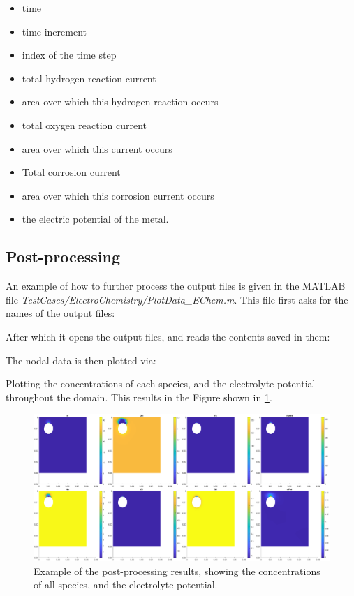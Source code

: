 \documentclass[3p]{elsarticle} %
\newcommand{\CodeSnipU}[4]{}
\begin{document}
\begin{itemize}
	\item time
	\item time increment
	\item index of the time step
	\item total hydrogen reaction current
	\item area over which this hydrogen reaction occurs
	\item total oxygen reaction current
	\item area over which this current occurs
	\item Total corrosion current
	\item area over which this corrosion current occurs
	\item the electric potential of the metal. 
\end{itemize}

\subsection{Post-processing}
An example of how to further process the output files is given in the MATLAB file \textit{TestCases/ElectroChemistry/PlotData\_EChem.m}. This file first asks for the names of the output files:
\CodeSnipU{TestCases/ElectroChemistry/PlotData_EChem.m}{7}{9}{TestCases/ElectroChemistry/PlotData\_EChem.m}
After which it opens the output files, and reads the contents saved in them:
\CodeSnipU{TestCases/ElectroChemistry/PlotData_EChem.m}{45}{61}{TestCases/ElectroChemistry/PlotData\_EChem.m}

The nodal data is then plotted via:
\CodeSnipU{TestCases/ElectroChemistry/PlotData_EChem.m}{78}{87}{TestCases/ElectroChemistry/PlotData\_EChem.m}
Plotting the concentrations of each species, and the electrolyte potential throughout the domain. This results in the Figure shown in \cref{fig:PostProcessingA}.

\begin{figure}
	\centering
	\includegraphics[width=14cm]{PostProcessingA.eps}
	\caption{Example of the post-processing results, showing the concentrations of all species, and the electrolyte potential. }
	\label{fig:PostProcessingA}
\end{figure}
\end{document}
